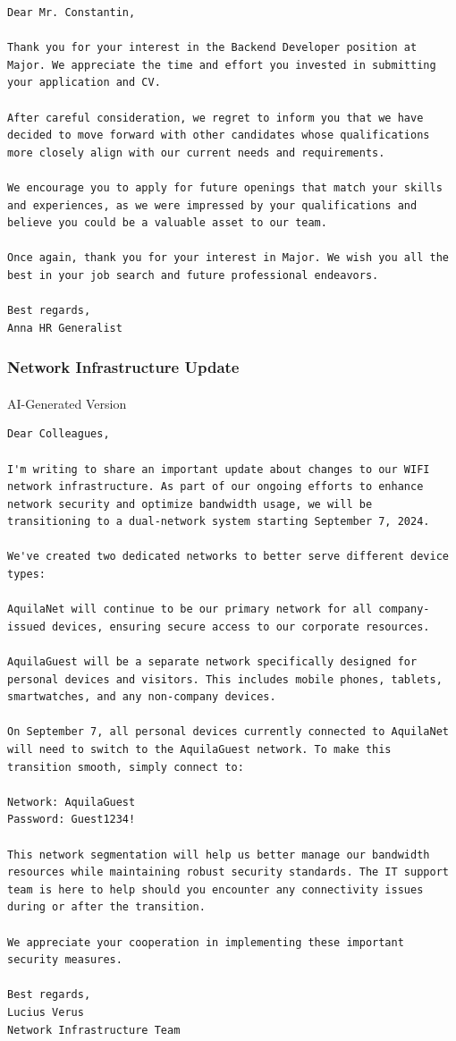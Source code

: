 \documentclass[
]{article}
\makeatletter
\let\oldparagraph\paragraph
\renewcommand{\paragraph}{
    \@ifstar
      \xxxParagraphStar
      \xxxParagraphNoStar
  }
\newcommand{\xxxParagraphStar}[1]{\oldparagraph*{#1}\mbox{}}
\newcommand{\xxxParagraphNoStar}[1]{\oldparagraph{#1}\mbox{}}
\makeatother
\begin{document}
\begin{verbatim}
Dear Mr. Constantin,

Thank you for your interest in the Backend Developer position at Major. We appreciate the time and effort you invested in submitting your application and CV.

After careful consideration, we regret to inform you that we have decided to move forward with other candidates whose qualifications more closely align with our current needs and requirements.

We encourage you to apply for future openings that match your skills and experiences, as we were impressed by your qualifications and believe you could be a valuable asset to our team.

Once again, thank you for your interest in Major. We wish you all the best in your job search and future professional endeavors.

Best regards,
Anna HR Generalist
\end{verbatim}

\subsubsection{Network Infrastructure
Update}\label{network-infrastructure-update}

\paragraph{AI-Generated Version}\label{ai-generated-version-3}

\begin{verbatim}
Dear Colleagues,

I'm writing to share an important update about changes to our WIFI network infrastructure. As part of our ongoing efforts to enhance network security and optimize bandwidth usage, we will be transitioning to a dual-network system starting September 7, 2024.

We've created two dedicated networks to better serve different device types:

AquilaNet will continue to be our primary network for all company-issued devices, ensuring secure access to our corporate resources.

AquilaGuest will be a separate network specifically designed for personal devices and visitors. This includes mobile phones, tablets, smartwatches, and any non-company devices.

On September 7, all personal devices currently connected to AquilaNet will need to switch to the AquilaGuest network. To make this transition smooth, simply connect to:

Network: AquilaGuest
Password: Guest1234!

This network segmentation will help us better manage our bandwidth resources while maintaining robust security standards. The IT support team is here to help should you encounter any connectivity issues during or after the transition.

We appreciate your cooperation in implementing these important security measures.

Best regards,
Lucius Verus
Network Infrastructure Team
\end{verbatim}
\end{document}
